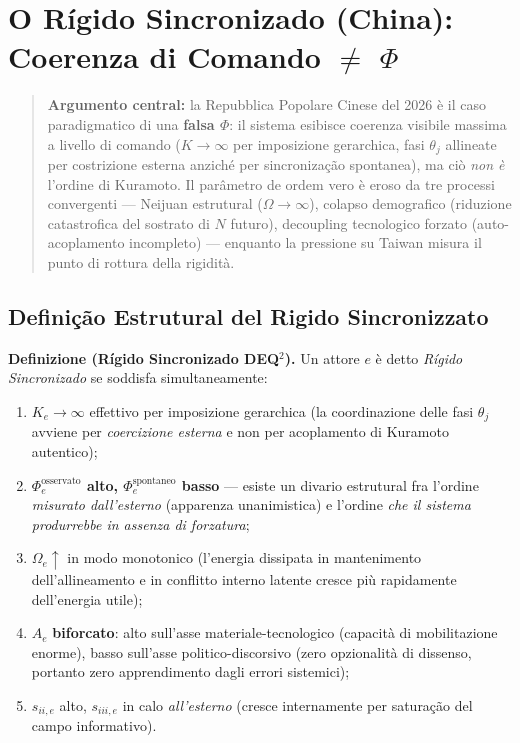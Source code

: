 \chapter{\texorpdfstring{O Rígido Sincronizado (China): Coerenza di
Comando $\neq$
\(\Phi\)}{O Rígido Sincronizado (China): Coerenza di Comando $\neq$ \textbackslash Phi}}\label{il-rigido-sincronizzato-cina-coerenza-di-comando-phi}

\begin{quote}
\textbf{Argumento central:} la Repubblica Popolare Cinese del 2026 è il
caso paradigmatico di una \textbf{falsa \(\Phi\)}: il sistema esibisce
coerenza visibile massima a livello di comando (\(K \to \infty\) per
imposizione gerarchica, fasi \(\theta_j\) allineate per costrizione
esterna anziché per sincronização spontanea), ma ciò \emph{non è}
l'ordine di Kuramoto. Il parâmetro de ordem vero è eroso da tre processi
convergenti --- Neijuan estrutural (\(\Omega \to \infty\)), colapso
demografico (riduzione catastrofica del sostrato di \(N\) futuro),
decoupling tecnologico forzato (auto-acoplamento incompleto) ---
enquanto la pressione su Taiwan misura il punto di rottura della rigidità.
\end{quote}



\section{Definição Estrutural del Rigido
Sincronizzato}\label{definição-estrutural-del-rigido-sincronizzato}

\Hypoth{} \textbf{Definizione (Rígido Sincronizado DEQ$^2$).} Un attore
\(e\) è detto \emph{Rígido Sincronizado} se soddisfa simultaneamente:

\begin{enumerate}
\def\labelenumi{\arabic{enumi}.}
\tightlist
\item
  \(K_e \to \infty\) effettivo per imposizione gerarchica (la
  coordinazione delle fasi \(\theta_j\) avviene per \emph{coercizione
  esterna} e non per acoplamento di Kuramoto autentico);
\item
  \textbf{\(\Phi_e^{\text{osservato}}\) alto,
  \(\Phi_e^{\text{spontaneo}}\) basso} --- esiste un divario estrutural
  fra l'ordine \emph{misurato dall'esterno} (apparenza unanimistica) e
  l'ordine \emph{che il sistema produrrebbe in assenza di forzatura};
\item
  \(\Omega_e \uparrow\) in modo monotonico (l'energia dissipata in
  mantenimento dell'allineamento e in conflitto interno latente cresce
  più rapidamente dell'energia utile);
\item
  \(A_e\) \textbf{biforcato}: alto sull'asse materiale-tecnologico
  (capacità di mobilitazione enorme), basso sull'asse
  politico-discorsivo (zero opzionalità di dissenso, portanto zero
  apprendimento dagli errori sistemici);
\item
  \(s_{ii,e}\) alto, \(s_{iii,e}\) in calo \emph{all'esterno} (cresce
  internamente per saturação del campo informativo).
\end{enumerate}

